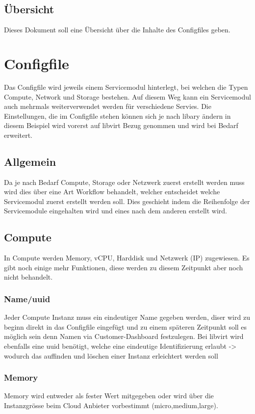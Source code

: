 \documentclass[11pt]{scrartcl}
\begin{document}
\subsection{Übersicht}
Dieses Dokument soll eine Übersicht über die Inhalte des Configfiles geben.

\section{Configfile}
Das Configfile wird jeweils einem Servicemodul hinterlegt, bei welchen die Typen 
Compute, Network und Storage bestehen.
Auf diesem Weg kann ein Servicemodul auch mehrmals weiterverwendet werden für 
verschiedene Servies.
Die Einstellungen, die im Configfile stehen können sich je nach libary ändern in 
diesem Beispiel wird vorerst auf libvirt Bezug genommen und wird bei Bedarf 
erweitert.

\subsection{Allgemein}
Da je nach Bedarf Compute, Storage oder Netzwerk zuerst erstellt werden muss 
wird dies über eine Art Workflow behandelt, welcher entscheidet welche 
Servicemodul zuerst erstellt werden soll.
Dies geschieht indem die Reihenfolge der Servicemodule eingehalten wird und 
eines nach dem anderen erstellt wird.

\subsection{Compute}
In Compute werden Memory, vCPU, Harddisk und Netzwerk (IP) zugewiesen.
Es gibt noch einige mehr Funktionen, diese werden zu diesem Zeitpunkt aber noch 
nicht behandelt.

\subsubsection{Name/uuid}
Jeder Compute Instanz muss ein eindeutiger Name gegeben werden, diser wird zu 
beginn direkt in das Configfile eingefügt und zu einem späteren Zeitpunkt soll 
es möglich sein denn Namen via Customer-Dashboard festzulegen.
Bei libvirt wird ebenfalls eine uuid benötigt, welche eine eindeutige 
Identifizierung erlaubt -> wodurch das auffinden und löschen einer Instanz 
erleichtert werden soll

\subsubsection{Memory}
Memory wird entweder als fester Wert mitgegeben oder wird über die Instanzgrösse 
beim Cloud Anbieter vorbestimmt (micro,medium,large).
\end{document}
